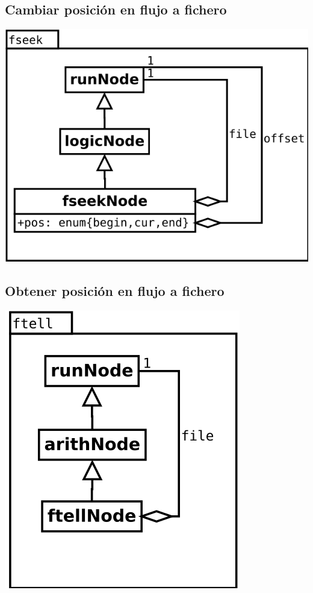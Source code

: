 \subsection {Cambiar posición en flujo a fichero} 
\begin{center}
\includegraphics[scale=0.4]{fseek.png} \\
\end{center}

\subsection {Obtener posición en flujo a fichero} 
\begin{center}
\includegraphics[scale=0.4]{ftell.png} \\
\end{center}

